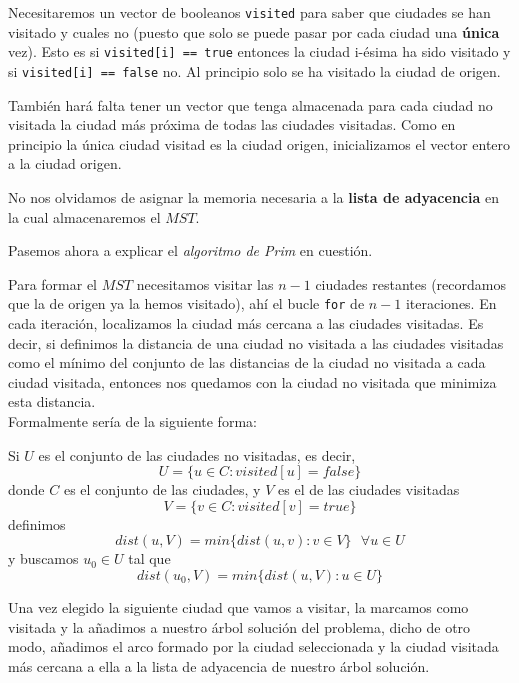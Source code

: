 \documentclass{article}
\begin{document}


Necesitaremos un vector de booleanos \verb|visited| para saber que ciudades se han visitado y cuales no (puesto que solo se puede pasar por cada ciudad una \textbf{única} vez). Esto es si \verb|visited[i] == true| entonces la ciudad i-ésima ha sido visitado y si \verb|visited[i] == false| no. Al principio solo se ha visitado la ciudad de origen.

También hará falta tener un vector que tenga almacenada para cada ciudad no visitada la ciudad más próxima de todas las ciudades visitadas. Como en principio la única ciudad visitad es la ciudad origen, inicializamos el vector entero a la ciudad origen.

No nos olvidamos de asignar la memoria necesaria a la \textbf{lista de adyacencia} en la cual almacenaremos el $MST$. 

Pasemos ahora a explicar el \textit{algoritmo de Prim} en cuestión.



Para formar el $MST$ necesitamos visitar las $n - 1$ ciudades restantes (recordamos que la de origen ya la hemos visitado), ahí el bucle \verb|for| de $n - 1$ iteraciones. En cada iteración, localizamos la ciudad más cercana a las ciudades visitadas. Es decir, si definimos la distancia de una ciudad no visitada a las ciudades visitadas como el mínimo del conjunto de las distancias de la ciudad no visitada a cada ciudad visitada, entonces nos quedamos con la ciudad no visitada que minimiza esta distancia. \\
Formalmente sería de la siguiente forma: 

Si $U$ es el conjunto de las ciudades no visitadas, es decir,
$$U=\{u \in C : visited[u] = false\}$$ donde $C$ es el conjunto de las ciudades, y $V$ es el de las ciudades visitadas $$V=\{v \in C : visited[v] = true\}$$ definimos
$$
    dist(u,V) = min \{dist(u,v) : v \in V\} \:\:\: \forall u \in U
$$
y buscamos $u_0 \in U$ tal que
$$
    dist(u_0,V) = min\{dist(u,V) : u \in U\}
$$



Una vez elegido la siguiente ciudad que vamos a visitar, la marcamos como visitada y la añadimos a nuestro árbol solución del problema, dicho de otro modo, añadimos el arco formado por la ciudad seleccionada y la ciudad visitada más cercana a ella a la lista de adyacencia de nuestro árbol solución.
\end{document}
